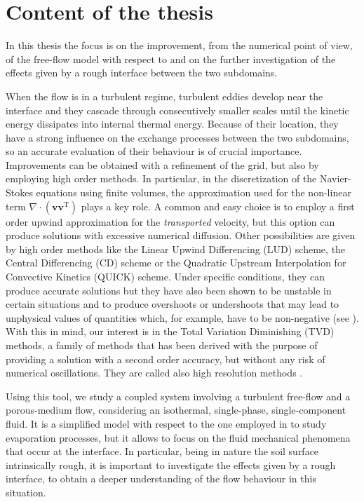 \section{Content of the thesis}
In this thesis the focus is on the improvement, from the numerical point of view, of the free-flow model with respect to \cite{tesi:fetzer} and on the further investigation of the effects given by a rough interface between the two subdomains.

When the flow is in a turbulent regime, turbulent eddies develop near the interface and 
they cascade through consecutively smaller scales until the kinetic energy 
dissipates into internal thermal energy. Because of their location, they have 
a strong influence on the exchange processes between the two subdomains, so an 
accurate evaluation of their behaviour is of crucial importance. Improvements 
can be obtained with a refinement of the grid, but also by employing 
high order methods. In 
particular, in the discretization of the Navier-Stokes equations using finite 
volumes, the approximation used for the non-linear term 
$\nabla \cdot (\mathbf{v} \mathbf{v}^\mathrm{T})$ plays a key role. A common and easy 
choice is to employ a first order upwind approximation for the 
\emph{transported} velocity, but this option can produce solutions with 
excessive numerical diffusion. Other possibilities are given by high order 
methods 
like the Linear Upwind Differencing (LUD) scheme, the Central Differencing (CD) 
scheme or the Quadratic Upstream Interpolation for Convective Kinetics (QUICK) 
scheme. Under specific conditions, they can produce 
accurate solutions but they have also been shown to be unstable in certain 
situations and to produce overshoots or undershoots that 
may lead to unphysical values of quantities which, for example, have to be 
non-negative (see \cite{main:vermal}). With this in mind, our interest is in 
the Total Variation Diminishing (TVD) methods, a family of methods that has 
been derived with the purpose of providing a solution with a second order 
accuracy, but without any risk of numerical oscillations. They are called also 
high resolution methods \cite{tvd:monotonicity}.

Using this tool, we study a coupled system involving a turbulent free-flow and a porous-medium flow, considering an isothermal, single-phase, single-component fluid. It is a simplified model with respect to the one employed in \cite{tesi:fetzer} to study evaporation processes, but it allows to focus on the fluid mechanical phenomena that occur at the interface. In particular, being in nature the soil surface intrinsically rough, it is important to investigate the effects given by a rough interface, to obtain a deeper understanding of the flow behaviour in this situation. 


